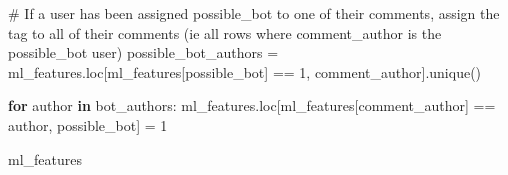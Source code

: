 \documentclass[
  12pt,
  letterpaper,
  DIV=11,
  numbers=noendperiod]{scrartcl}
\newenvironment{Shaded}{\begin{snugshade}}{\end{snugshade}}
\newcommand{\CommentTok}[1]{\textcolor[rgb]{0.37,0.37,0.37}{#1}}
\newcommand{\ControlFlowTok}[1]{\textcolor[rgb]{0.00,0.23,0.31}{\textbf{#1}}}
\newcommand{\DecValTok}[1]{\textcolor[rgb]{0.68,0.00,0.00}{#1}}
\newcommand{\KeywordTok}[1]{\textcolor[rgb]{0.00,0.23,0.31}{\textbf{#1}}}
\newcommand{\NormalTok}[1]{\textcolor[rgb]{0.00,0.23,0.31}{#1}}
\newcommand{\OperatorTok}[1]{\textcolor[rgb]{0.37,0.37,0.37}{#1}}
\newcommand{\StringTok}[1]{\textcolor[rgb]{0.13,0.47,0.30}{#1}}
\begin{document}
\begin{Shaded}
\begin{Highlighting}[]
\CommentTok{\# If a user has been assigned possible\_bot to one of their comments, assign the tag to all of their comments (ie all rows where comment\_author is the possible\_bot user)}
\NormalTok{possible\_bot\_authors }\OperatorTok{=}\NormalTok{ ml\_features.loc[ml\_features[}\StringTok{\textquotesingle{}possible\_bot\textquotesingle{}}\NormalTok{] }\OperatorTok{==} \DecValTok{1}\NormalTok{, }\StringTok{\textquotesingle{}comment\_author\textquotesingle{}}\NormalTok{].unique()}

\ControlFlowTok{for}\NormalTok{ author }\KeywordTok{in}\NormalTok{ bot\_authors:}
\NormalTok{    ml\_features.loc[ml\_features[}\StringTok{\textquotesingle{}comment\_author\textquotesingle{}}\NormalTok{] }\OperatorTok{==}\NormalTok{ author, }\StringTok{\textquotesingle{}possible\_bot\textquotesingle{}}\NormalTok{] }\OperatorTok{=} \DecValTok{1}

\NormalTok{ml\_features}
\end{Highlighting}
\end{Shaded}
\end{document}
